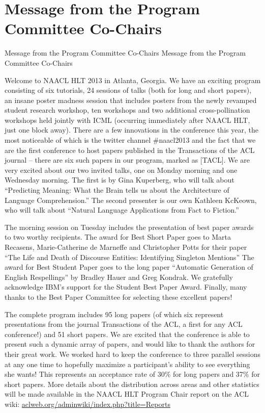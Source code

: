 \section*{Message from the Program Committee Co-Chairs}
\setheaders%
    {Message from the Program Committee Co-Chairs}%
    {Message from the Program Committee Co-Chairs}
\thispagestyle{emptyheader}
\begin{large}

\setlength{\parskip}{.7ex}

Welcome to NAACL HLT 2013 in Atlanta, Georgia. We have an exciting program consisting of six tutorials, 24 sessions of talks (both for long and short papers), an insane poster madness session that includes posters from the newly revamped student research workshop, ten workshops and two additional cross-pollination workshops held jointly with ICML (occurring immediately after NAACL HLT, just one block away). There are a few innovations in the conference this year, the most noticeable of which is the twitter channel \#naacl2013 and the fact that we are the first conference to host papers published in the Transactions of the ACL journal -- there are six such papers in our program, marked as [TACL].
We are very excited about our two invited talks, one on Monday morning and one Wednesday morning. The first is by Gina Kuperberg, who will talk about ``Predicting Meaning: What the Brain tells us about the Architecture of Language Comprehension.'' The second presenter is our own Kathleen KcKeown, who will talk about ``Natural Language Applications from Fact to Fiction.''

The morning session on Tuesday includes the presentation of best paper awards to two worthy recipients. The award for Best Short Paper goes to Marta Recasens, Marie-Catherine de Marneffe and Christopher Potts for their paper ``The Life and Death of Discourse Entities: Identifying Singleton Mentions'' The award for Best Student Paper goes to the long paper ``Automatic Generation of English Respellings'' by Bradley Hauer and Greg Kondrak. We gratefully acknowledge IBM’s support for the Student Best Paper Award. Finally, many thanks to the Best Paper Committee for selecting these excellent papers!

The complete program includes 95 long papers (of which six represent presentations from the journal Transactions of the ACL, a first for any ACL conference!) and 51 short papers. We are excited that the conference is able to present such a dynamic array of papers, and would like to thank the authors for their great work. We worked hard to keep the conference to three parallel sessions at any one time to hopefully maximize a participant's ability to see everything she wants! This represents an acceptance rate of 30\% for long papers and 37\% for short papers. More details about the distribution across areas and other statistics will be made available in the NAACL HLT Program Chair report on the ACL wiki: \url{aclweb.org/adminwiki/index.php?title=Reports}


\end{large}
